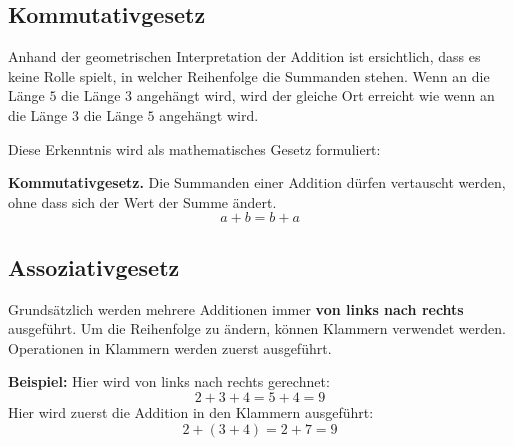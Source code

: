 \subsection{Kommutativgesetz}

Anhand der geometrischen Interpretation der Addition ist ersichtlich, dass es keine Rolle spielt, in welcher Reihenfolge die Summanden stehen. Wenn an die Länge $5$ die Länge $3$ angehängt wird, wird der gleiche Ort erreicht wie wenn an die Länge $3$ die Länge $5$ angehängt wird.
\begin{center}
\end{center}
Diese Erkenntnis wird als mathematisches Gesetz formuliert:
\begin{theorem}
\textbf{Kommutativgesetz.} Die Summanden einer Addition dürfen vertauscht werden, ohne dass sich der Wert der Summe ändert.
\[
  a + b = b + a
\]
\end{theorem}

\subsection{Assoziativgesetz}

Grundsätzlich werden mehrere Additionen immer \textbf{von links nach rechts} ausgeführt. Um die Reihenfolge zu ändern, können Klammern verwendet werden. Operationen in Klammern werden zuerst ausgeführt.
\begin{example}
  \textbf{Beispiel:} Hier wird von links nach rechts gerechnet:
  \[
    2 + 3 + 4 = 5 + 4 = 9
  \]
  Hier wird zuerst die Addition in den Klammern ausgeführt:
  \[
    2 + (3 + 4) = 2 + 7 = 9
  \]
\end{example}

